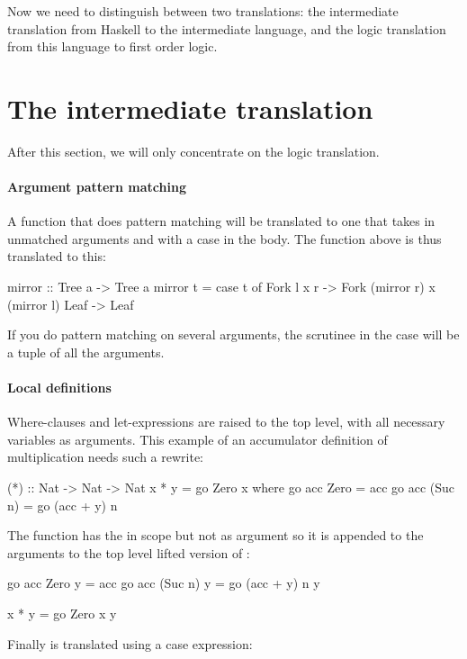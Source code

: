Now we need to distinguish between two translations: the intermediate
translation from Haskell to the intermediate language, and the logic
translation from this language to first order logic.

\section{The intermediate translation}

After this section, we will only concentrate on the logic translation.

\paragraph{Argument pattern matching} A function that does pattern matching will be translated to one that
takes in unmatched arguments and with a case in the body. The
 function above is thus translated to this:

\begin{code}
mirror :: Tree a -> Tree a
mirror t = case t of
   Fork l x r -> Fork (mirror r) x (mirror l)
   Leaf       -> Leaf
\end{code}

\noindent
If you do pattern matching on several arguments, the scrutinee in the
case will be a tuple of all the arguments.

\paragraph{Local definitions} Where-clauses and let-expressions are raised
to the top level, with all necessary variables as arguments. This
example of an accumulator definition of multiplication needs such a
rewrite:

\begin{code}
(*) :: Nat -> Nat -> Nat
x * y = go Zero x
  where
    go acc Zero    = acc
    go acc (Suc n) = go (acc + y) n
\end{code}

\noindent
The  function has the  in scope but not as argument so it
is appended to the arguments to the top level lifted version of :

\begin{code}
go acc Zero    y = acc
go acc (Suc n) y = go (acc + y) n y

x * y = go Zero x y
\end{code}

\noindent
Finally  is translated using a case expression:

